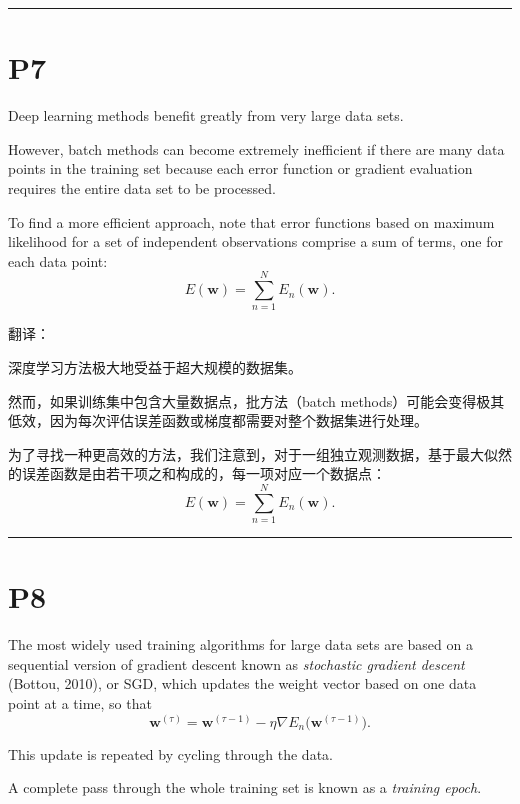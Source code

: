 \documentclass{article}
\begin{document}
\noindent\rule{\linewidth}{0.4pt}

\section{P7}%

Deep learning methods benefit greatly from very large data sets. 

However, batch methods can become extremely inefficient if there are many data points in the training set because each error function or gradient evaluation requires the entire data set to be processed. 

To find a more efficient approach, note that error functions based on maximum likelihood for a set of independent observations comprise a sum of terms, one for each data point:
\begin{equation}
E(\mathbf{w}) = \sum_{n=1}^{N} E_n(\mathbf{w}).
\tag{7.17}
\end{equation}

{\color{red}
翻译：

深度学习方法极大地受益于超大规模的数据集。

然而，如果训练集中包含大量数据点，批方法（batch methods）可能会变得极其低效，因为每次评估误差函数或梯度都需要对整个数据集进行处理。

为了寻找一种更高效的方法，我们注意到，对于一组独立观测数据，基于最大似然的误差函数是由若干项之和构成的，每一项对应一个数据点：
$$E(\mathbf{w}) = \sum_{n=1}^{N} E_n(\mathbf{w}).$$
}

\noindent\rule{\linewidth}{0.4pt}

\section{P8}

The most widely used training algorithms for large data sets are based on a sequential version of gradient descent known as \emph{stochastic gradient descent} (Bottou, 2010), or SGD, which updates the weight vector based on one data point at a time, so that
\begin{equation}
\mathbf{w}^{(\tau)} = \mathbf{w}^{(\tau-1)} - \eta \nabla E_n\bigl(\mathbf{w}^{(\tau-1)}\bigr).
\tag{7.18}
\end{equation}

This update is repeated by cycling through the data. 

A complete pass through the whole training set is known as a \emph{training epoch}. 
\end{document}
